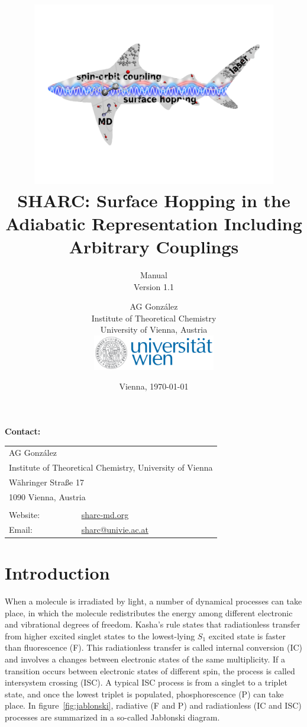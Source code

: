 \documentclass[a4paper,11pt,DIV=15,openany,twoside=false]{scrbook}
\title{\hspace{1cm}\includegraphics[width=0.8\textwidth,keepaspectratio=true]{img/sharc.pdf}\\[0.5cm]
    SHARC: Surface Hopping in the Adiabatic Representation Including Arbitrary Couplings}
\subtitle{Manual\\[1cm]Version 1.1}
\date{Vienna, \today}
\author{AG Gonz\'alez\\
Institute of Theoretical Chemistry\\
University of Vienna, Austria
\vspace{1cm}
\\
\includegraphics[width=0.4\textwidth,keepaspectratio=true]{img/univie.pdf}}
\newcommand{\tthdump}[1]{#1}
\begin{document}
\tpage

\tthdump{
  \begin{shaded}
    \textbf{Contact:}

    \begin{tabular}{ll}
      \\
      \multicolumn{2}{l}{AG Gonz\'alez}\\
      \multicolumn{2}{l}{Institute of Theoretical Chemistry, University of Vienna}\\
      \multicolumn{2}{l}{W\"ahringer Stra\ss{}e 17}\\
      \multicolumn{2}{l}{1090 Vienna, Austria}\\
      \\
      Website: &\href{http://sharc-md.org}{sharc-md.org}\\
      Email: &\href{mailto:sharc@univie.ac.at}{sharc@univie.ac.at}\\
    \end{tabular}
  \end{shaded}
}

\newpage
{}
\ohead{\rightmark}
\ofoot[\pagemark]{\pagemark}


\tableofcontents


\chapter{Introduction}

When a molecule is irradiated by light, a number of dynamical processes can take place, in which the molecule redistributes the energy among different electronic and vibrational degrees of freedom. Kasha's rule \cite{Kasha1950DFS} states that radiationless transfer from higher excited singlet states to the lowest-lying $S_1$ excited state is faster than fluorescence (F). This radiationless transfer is called internal conversion (IC) and involves a changes between electronic states of the same multiplicity. If a transition occurs between electronic states of different spin, the process is called intersystem crossing (ISC). A typical ISC process is from a singlet to a triplet state, and once the lowest triplet is populated, phosphorescence (P) can take place. In figure~\ref{fig:jablonski}, radiative (F and P) and radiationless (IC and ISC) processes are summarized in a so-called Jab{\l}onski diagram.
\end{document}
